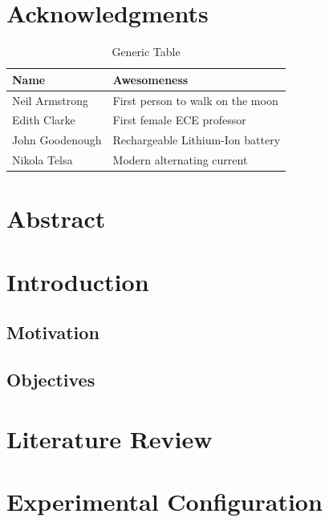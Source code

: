\documentclass[12pt,oneside]{book}
\begin{document}
\mainmatter

\chapter*{Acknowledgments}

\begin{table}[!ht]
	\centering
	\caption*{Generic Table}
	\begin{tabular}{ll}
		\toprule[1.5pt]
		Name & Awesomeness \\ 
		\midrule
		Neil Armstrong		 & First person to walk on the moon \\
		Edith Clarke		 & First female ECE professor \\
		John Goodenough		 & Rechargeable Lithium-Ion battery \\
		Nikola Telsa		 & Modern alternating current \\  
		\bottomrule[1.25pt]
	\end{tabular}
\end{table}

\newpage

\chapter*{Abstract}

\newpage
\chapter{Introduction}
\label{chap:intro}
\setcounter{page}{1}

\section{Motivation}

\section{Objectives}

\chapter{Literature Review}
\label{chap:lit_review}

\chapter{Experimental Configuration}
\label{chap:exp_config}
\end{document}
